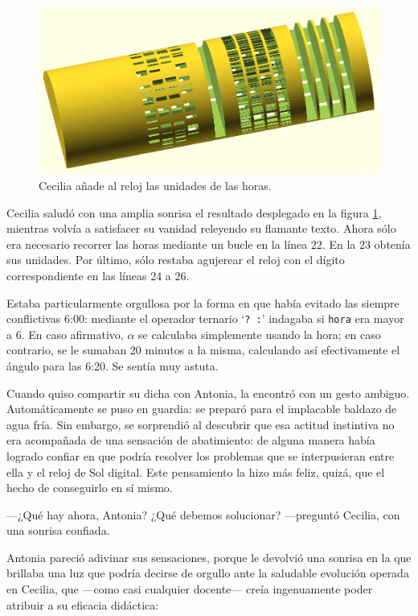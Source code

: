 \begin{figure}[ht]
  \centering
  \includegraphics[width=.85\textwidth]{imagenes/hora-unidades-1}  
  \caption{Cecilia añade al reloj las unidades de las horas.}
  \label{fig:hora-unidades-1}
\end{figure}

Cecilia saludó con una amplia sonrisa el resultado desplegado en la
figura \ref{fig:hora-unidades-1}, mientras volvía a satisfacer su
vanidad releyendo su flamante texto. Ahora sólo era necesario recorrer
las horas mediante un bucle en la línea 22. En la 23 obtenía sus
unidades. Por último, sólo restaba agujerear el reloj con el dígito
correspondiente en las líneas 24 a 26.

Estaba particularmente orgullosa por la forma en que había evitado las
siempre conflictivas 6:00: mediante el operador ternario
`\lstinline!? :!' indagaba si \lstinline!hora! era mayor a 6. En caso
afirmativo, $\alpha$ se calculaba simplemente usando la hora; en caso
contrario, se le sumaban 20 minutos a la misma, calculando así
efectivamente el ángulo para las 6:20. Se sentía muy astuta.

Cuando quiso compartir su dicha con Antonia, la encontró con un gesto
ambiguo. Automáticamente se puso en guardia: se preparó para el
implacable baldazo de agua fría. Sin embargo, se sorprendió al
descubrir que esa actitud instintiva no era acompañada de una
sensación de abatimiento: de alguna manera había logrado confiar en
que podría resolver los problemas que se interpusieran entre ella y el
reloj de Sol digital. Este pensamiento la hizo más feliz, quizá, que
el hecho de conseguirlo en sí mismo.

---¿Qué hay ahora, Antonia? ¿Qué debemos solucionar?  ---pre\-gun\-tó
Cecilia, con una sonrisa confiada.

Antonia pareció adivinar sus sensaciones, porque le devolvió una
sonrisa en la que brillaba una luz que podría decirse de orgullo ante
la saludable evolución operada en Cecilia, que ---co\-mo casi cualquier
docente--- creía ingenuamente poder atribuir a su eficacia didáctica:

